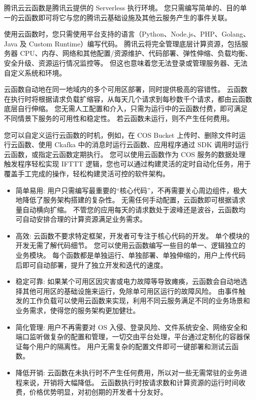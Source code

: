 \begin{definition}
    腾讯云云函数是腾讯云提供的 Serverless 执行环境。 您只需编写简单的、目的单一的云函数即可将它与您的腾讯云基础设施及其他云服务产生的事件关联。 

使用云函数时，您只需使用平台支持的语言（Python、Node.js、PHP、Golang、Java 及 Custom Runtime）编写代码。 腾讯云将完全管理底层计算资源，包括服务器 CPU、内存、网络和其他配置/资源维护、代码部署、弹性伸缩、负载均衡、安全升级、资源运行情况监控等。 但这也意味着您无法登录或管理服务器、无法自定义系统和环境。 

云函数自动地在同一地域内的多个可用区部署，同时提供极高的容错性。 云函数在执行时将根据请求负载扩缩容，从每天几个请求到每秒数千个请求，都由云函数底层自行伸缩。 您无需人工配置和介入，只需为运行中的云函数付费，即可满足不同情景下服务的可用性和稳定性。 若云函数未运行，则不产生任何费用。 

您可以自定义运行云函数的时机，例如，在 COS Bucket 上传时、删除文件时运行云函数、使用 Ckafka 中的消息时运行云函数、应用程序通过 SDK 调用时运行云函数，或指定云函数定期执行。 您可以使用云函数作为 COS 服务的数据处理触发程序轻松实现 IFTTT 逻辑，您也可以通过构建灵活的定时自动化任务，用于覆盖手工完成的操作，轻松构建灵活可控的软件架构。 

\begin{itemize}
    \item 简单易用: 用户只需编写最重要的“核心代码”，不再需要关心周边组件，极大地降低了服务架构搭建的复杂性。 无需任何手动配置，云函数即可根据请求量自动横向扩缩。 不管您的应用每天的请求数处于波峰还是波谷，云函数均可自动安排合理的计算资源满足业务需求。 
    \item 高效: 云函数不要求特定框架，开发者可专注于核心代码的开发。 单个模块的开发无需了解代码细节。 您可以使用云函数编写一些目的单一、逻辑独立的业务模块。 每个函数都是单独运行、单独部署、单独伸缩的，用户上传代码后即可自动部署，提升了独立开发和迭代的速度。 
    \item 稳定可靠: 如果某个可用区因灾害或电力故障等导致瘫痪，云函数会自动地选择其他可用区的基础设施来运行，免除单可用区运行的故障风险。 由事件触发的工作负载可以使用云函数来实现，利用不同云服务满足不同的业务场景和业务需求，使得您的服务架构更加健壮。 
    \item 简化管理: 用户不再需要对 OS 入侵、登录风险、文件系统安全、网络安全和端口监听做复杂的配置和管理，一切交由平台处理，平台通过定制化的容器保证每个用户的隔离性。 用户无需复杂的配置文件即可一键部署和测试云函数。 
    \item 降低开销: 云函数在未执行时不产生任何费用，所以对一些无需常驻的业务进程来说，开销将大幅降低。 云函数执行时按请求数和计算资源的运行时间收费，价格优势明显，对初创期的开发者十分友好。 
\end{itemize}
\end{definition}


